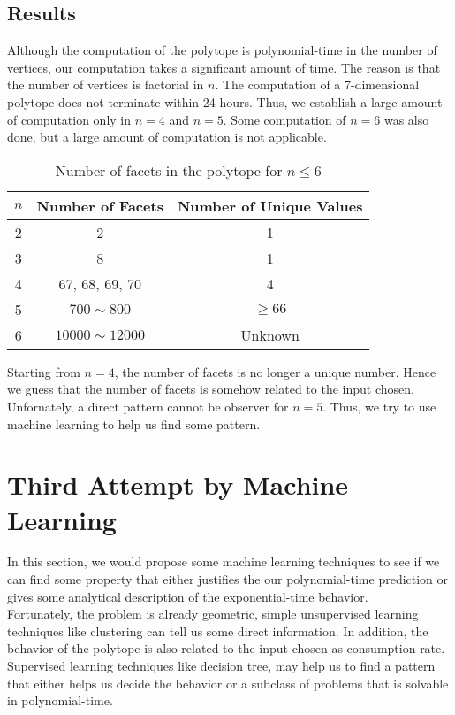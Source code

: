\documentclass[12pt,letterpaper]{article}
\begin{document}
\subsection{Results}
Although the computation of the polytope is polynomial-time in the number of vertices, our computation takes 
a significant amount of time. The reason is that the number of vertices is factorial in $n$. 
The computation of a 7-dimensional polytope does not terminate within 24 hours. Thus, we establish a large amount of 
computation only in $n = 4$ and $n = 5$. Some computation of $n = 6$ was also done, but a large amount of computation 
is not applicable. 
\begin{table}
    \centering
    \begin{tabular}{||c | c | c ||}
        \hline 
        $n$ & Number of Facets & Number of Unique Values\\
        \hline 
        \hline 
        2 & 2 & 1\\
        \hline 
        3 & 8 & 1\\
        \hline 
        4 & 67, 68, 69, 70 & 4\\
        \hline 
        5 & $700 \sim 800$ & $\geq 66$\\
        \hline 
        6 & $10000 \sim 12000$  & Unknown\\
        \hline 
    \end{tabular}
    \caption{Number of facets in the polytope for $n \leq 6$}
\end{table}
Starting from $n = 4$, the number of facets is no longer a unique number. 
Hence we guess that the number of facets is somehow related to the input chosen. 
Unfornately, a direct pattern cannot be observer for $n=5$. 
Thus, we try to use machine learning to help us find some pattern. 


\section{Third Attempt by Machine Learning}
In this section, we would propose some machine learning techniques to see if we can find some property that 
either justifies the our polynomial-time prediction or gives some analytical description of the exponential-time behavior. \\
Fortunately, the problem is already geometric, simple unsupervised learning techniques like clustering
can tell us some direct information. In addition, the behavior of the polytope is also related to the input chosen 
as consumption rate. Supervised learning techniques like decision tree, may help us to find a pattern
that either helps us decide the behavior or a subclass of problems that is solvable in polynomial-time.
\end{document}

